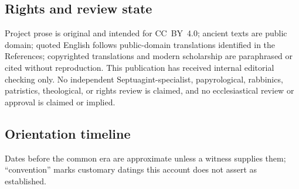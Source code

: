 \subsection{Rights and review state}

Project prose is original and intended for CC~BY~4.0; ancient texts are
public domain; quoted English follows public-domain translations
identified in the References; copyrighted translations and modern
scholarship are paraphrased or cited without reproduction. This
publication has received internal editorial checking only. No independent
Septuagint-specialist, papyrological, rabbinics, patristics, theological,
or rights review is claimed, and no ecclesiastical review or approval is
claimed or implied.

\subsection{Orientation timeline}

Dates before the common era are approximate unless a witness supplies
them; ``convention'' marks customary datings this account does not assert
as established.

